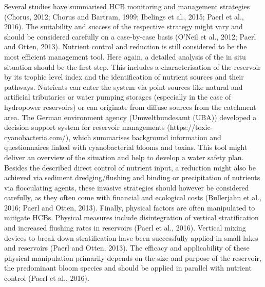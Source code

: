 Several studies have summarised HCB monitoring and management strategies (Chorus, 2012; Chorus and Bartram, 1999; Ibelings et al., 2015; Paerl et al., 2016). The suitability and success of the respective strategy might vary and should be considered carefully on a case-by-case basis (O’Neil et al., 2012; Paerl and Otten, 2013). Nutrient control and reduction is still considered to be the most efficient management tool. Here again, a detailed analysis of the in situ situation should be the first step. This includes a characterisation of the reservoir by its trophic level index and the identification of nutrient sources and their pathways. Nutrients can enter the system via point sources like natural and artificial tributaries or water pumping storages (especially in the case of hydropower reservoirs) or can originate from diffuse sources from the catchment area. The German environment agency (Umweltbundesamt (UBA)) developed a decision support system for reservoir managements (https://toxic-cyanobacteria.com/), which summarises background information and questionnaires linked with cyanobacterial blooms and toxins. This tool might deliver an overview of the situation and help to develop a water safety plan.
Besides the described direct control of nutrient input, a reduction might also be achieved via sediment dredging/flushing and binding or precipitation of nutrients via flocculating agents,  these invasive strategies should however be considered carefully, as they often come with financial and ecological costs (Bullerjahn et al., 2016; Paerl and Otten, 2013). Finally, physical factors are often manipulated to mitigate HCBs. Physical measures include disintegration of vertical stratification and increased flushing rates in reservoirs (Paerl et al., 2016). Vertical mixing devices to break down stratification have been successfully applied in small lakes and reservoirs (Paerl and Otten, 2013). The efficacy and applicability of these physical manipulation primarily depends on the size and purpose of the reservoir, the predominant bloom species and should be applied in parallel with nutrient control (Paerl et al., 2016).
